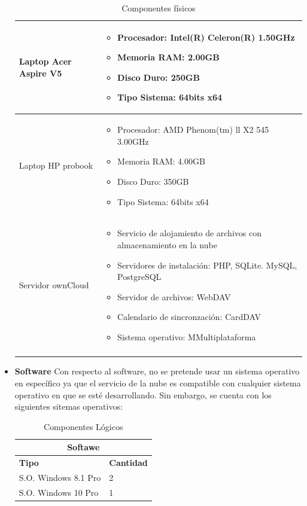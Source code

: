\begin{itemize}
\begin{longtable}{ | p{5cm} | p{10.5cm} |}
Laptop Acer Aspire V5 & \begin{itemize}
\item Procesador: Intel(R) Celeron(R) 1.50GHz 
\item Memoria RAM: 2.00GB
\item Disco Duro: 250GB
\item Tipo Sistema: 64bits x64
\end{itemize} \\ \hline

Laptop HP probook & \begin{itemize}
\item Procesador: AMD Phenom(tm) ll X2 545 3.00GHz 
\item Memoria RAM: 4.00GB
\item Disco Duro: 350GB
\item Tipo Sistema: 64bits x64
\end{itemize} \\ \hline

Servidor ownCloud & \begin{itemize}
\item Servicio de alojamiento de archivos con almacenamiento en la nube
\item Servidores de instalación: PHP, SQLite. MySQL, PostgreSQL
\item Servidor de archivos: WebDAV
\item Calendario de sincronzación: CardDAV
\item Sistema operativo: MMultiplataforma
\end{itemize} \\ \hline
\caption{Componentes físicos}
\label{Hardware}
\end{longtable}

\item \textbf{Software}
Con respecto al software, no se pretende usar un sistema operativo en específico ya que el servicio de la nube es compatible con cualquier sistema operativo en que se esté desarrollando. Sin embargo, se cuenta con los siguientes sitemas operativos: 

\begin{table}[htb]
\centering
\begin{tabular}{| p{5cm} | p{10.5cm} |}
\hline
\multicolumn{2}{|c|}{\textbf{Softawe}} \\ \hline
\textbf{Tipo} & \textbf{Cantidad} \\
\hline \hline
S.O. Windows 8.1 Pro & 2\\ \hline
S.O. Windows 10 Pro & 1\\ \hline

\end{tabular}
\caption{Componentes Lógicos}
\label{Servidor de Llaves }
\end{table}
\end{itemize}




